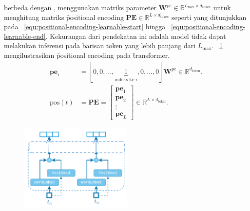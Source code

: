 	berbeda dengan \cite{transformerori}, \cite{bertori} menggunakan matriks parameter $\mathbf{W}^{pe} \in \mathbb{R}^{L_{\max} \times d_{\text{token}}}$ untuk menghitung matriks \f{positional encoding} $\mathbf{PE} \in \mathbb{R}^{L \times d_{\text{token}}}$ seperti yang ditunjukkan pada \equ~\ref{equ:positional-encoding-learnable-start} hingga \equ~\ref{equ:positional-encoding-learnable-end}. Kekurangan dari pendekatan ini adalah model tidak dapat melakukan inferensi pada barisan token yang lebih panjang dari $L_{\max}$. \pic~\ref{fig:positional-encoding} mengilustrasikan \f{positional encoding} pada \f{transformer}.
	\begin{align}
		\label{equ:positional-encoding-learnable-start}
		\mathbf{pe}_{i} &= [0, 0,\dots, \underbrace{1}_{\text{indeks ke-}i},0, \dots, 0] \mathbf{W}^{pe} \in \mathbb{R}^{d_{\text{token}}}, \\
		\label{equ:positional-encoding-learnable-end}
		 \text{pos}(t) &= \mathbf{PE} = \begin{bmatrix}
			\mathbf{pe}_1 \\
			\mathbf{pe}_2 \\
			\vdots \\
			\mathbf{pe}_L
		\end{bmatrix} \in \mathbb{R}^{L \times d_{\text{token}}}.
	\end{align}
	\begin{figure}

		\centering
		\includegraphics[width=0.5\textwidth]{assets/pics/positional_encoding.png}
		\label{fig:positional-encoding}
	\end{figure}

